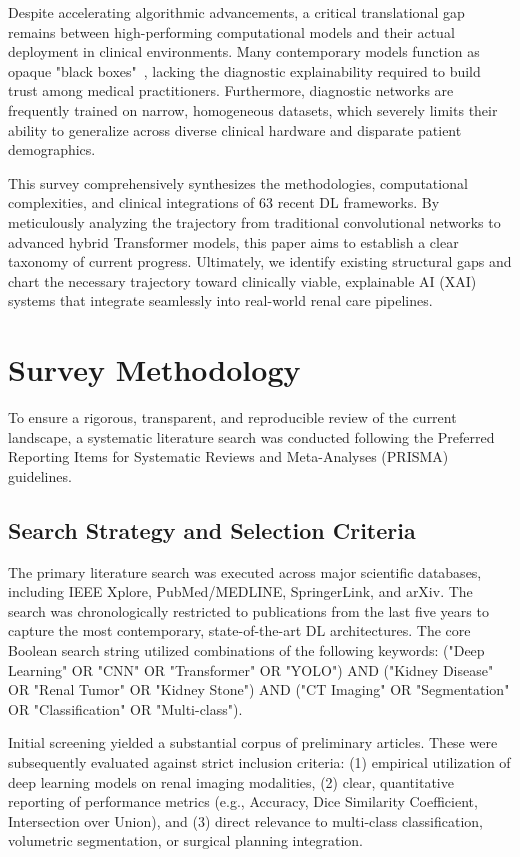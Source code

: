 \documentclass[pdflatex,sn-mathphys-num]{sn-jnl}%
\begin{document}
Despite accelerating algorithmic advancements, a critical translational gap remains between high-performing computational models and their actual deployment in clinical environments. Many contemporary models function as opaque "black boxes"~\cite{kadhim2024machine}, lacking the diagnostic explainability required to build trust among medical practitioners. Furthermore, diagnostic networks are frequently trained on narrow, homogeneous datasets, which severely limits their ability to generalize across diverse clinical hardware and disparate patient demographics.

This survey comprehensively synthesizes the methodologies, computational complexities, and clinical integrations of 63 recent DL frameworks. By meticulously analyzing the trajectory from traditional convolutional networks to advanced hybrid Transformer models, this paper aims to establish a clear taxonomy of current progress. Ultimately, we identify existing structural gaps and chart the necessary trajectory toward clinically viable, explainable AI (XAI) systems that integrate seamlessly into real-world renal care pipelines.

\section{Survey Methodology}
\label{sec:methodology}

To ensure a rigorous, transparent, and reproducible review of the current landscape, a systematic literature search was conducted following the Preferred Reporting Items for Systematic Reviews and Meta-Analyses (PRISMA) guidelines.

\subsection{Search Strategy and Selection Criteria}
The primary literature search was executed across major scientific databases, including IEEE Xplore, PubMed/MEDLINE, SpringerLink, and arXiv. The search was chronologically restricted to publications from the last five years to capture the most contemporary, state-of-the-art DL architectures. The core Boolean search string utilized combinations of the following keywords: ("Deep Learning" OR "CNN" OR "Transformer" OR "YOLO") AND ("Kidney Disease" OR "Renal Tumor" OR "Kidney Stone") AND ("CT Imaging" OR "Segmentation" OR "Classification" OR "Multi-class").

Initial screening yielded a substantial corpus of preliminary articles. These were subsequently evaluated against strict inclusion criteria: (1) empirical utilization of deep learning models on renal imaging modalities, (2) clear, quantitative reporting of performance metrics (e.g., Accuracy, Dice Similarity Coefficient, Intersection over Union), and (3) direct relevance to multi-class classification, volumetric segmentation, or surgical planning integration. 
\end{document}
